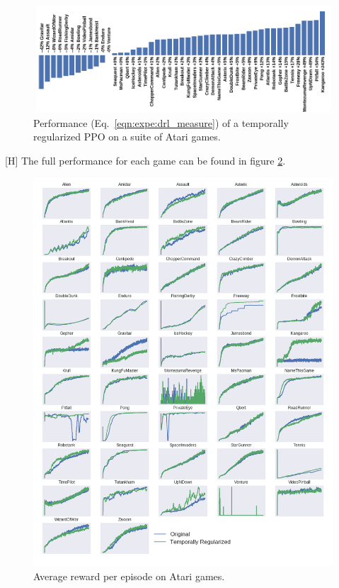 \begin{figure}
    \centering
    \includegraphics[width=13cm,height=4cm]{./fig/bar_atari.png}
    \caption[Deep Reinforcement Learning performance]{Performance (Eq.~\ref{eqn:expe:drl_measure}) of a temporally regularized PPO on a suite of Atari games.}
    \label{fig:graph_atari}
\end{figure}[H]
The full performance for each game can be found in figure \ref{fig:my_label}.
\begin{figure}
    \centering
    \includegraphics[scale=0.5]{./fig/plot_atari.png}
    \caption[Full results Deep Reinforcement Learning]{Average reward per episode on Atari games.}
    \label{fig:my_label}
\end{figure}
